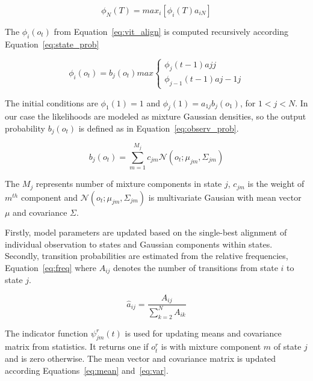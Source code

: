 {\begin{equation}\label{eq:vit_align}
    \phi_N(T)= max_i[\phi_i(T)a_{iN}] 
\end{equation}


The $\phi_i(o_t)$ from Equation~\ref{eq:vit_align} is computed recursively according Equation~\ref{eq:state_prob}

\begin{equation}\label{eq:state_prob}
    \phi_i(o_t) = b_j(o_t) max \left\{
  \begin{array}{lr}
      \phi_j(t-1)a{jj}\\
      \phi_{j-1}(t-1)a{j-1j}
  \end{array}
\right.
\end{equation}

The initial conditions are $\phi_1(1)=1$ and $\phi_j(1)= a_{1j}b_j(o_1)$, for $ 1 < j < N$.
In our case the likelihoods are modeled as mixture Gaussian densities, so the output probability $b_j(o_t)$ is defined as in Equation~\ref{eq:observ_prob}.

\begin{equation}\label{eq:observ_prob}
    b_j(o_t) = \sum_{m=1}^{M_j}{c_{jm}\mathcal{N}(o_t; \mu_{jm}, \Sigma_{jm})}
\end{equation}

The $M_j$ represents number of mixture components in state $j$, $c_{jm}$ is the weight of $m^{th}$ component and $\mathcal{N}(o_t; \mu_{jm}, \Sigma_{jm})$
is multivariate Gausian with mean vector $\mu$ and covariance $\Sigma$.

Firstly, model parameters are updated based on the single-best alignment of individual observation to states and Gaussian components within states.
Secondly, transition probabilities are estimated from the relative frequencies, Equation~\ref{eq:freq} where $A_{ij}$ denotes the number of transitions from state $i$ to state $j$.

\begin{equation}\label{eq:freq}
    \hat{a}_{ij} = \frac{A_{ij}}{\sum_{k=2}^{N}{A_{ik}}}
\end{equation}

The indicator function $\psi^r_{jm}(t)$ is used for updating means and covariance matrix from statistics.
It returns one if $o^r_t$ is  with mixture component $m$ of state $j$ and is zero otherwise.
The mean vector and covariance matrix is updated according Equations~\ref{eq:mean} and~\ref{eq:var}.

}
